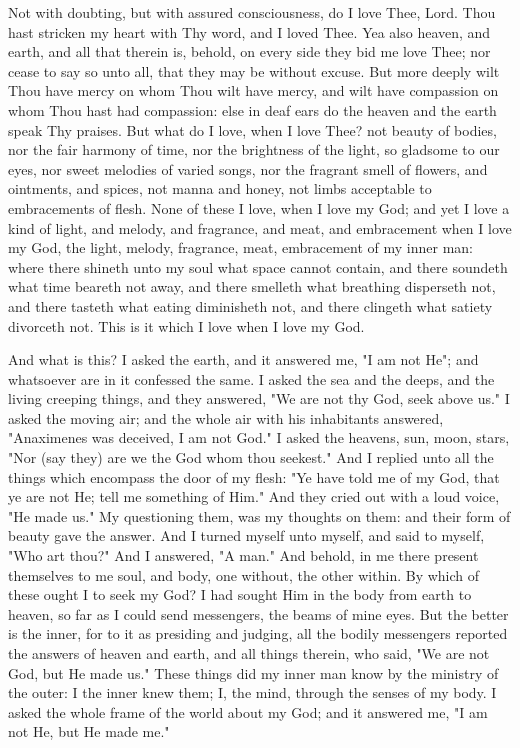 \documentclass[b5paper,openright,12pt,twoside]{book}
\begin{document}
Not with doubting, but with assured consciousness, do I love Thee, Lord.
Thou hast stricken my heart with Thy word, and I loved Thee. Yea also
heaven, and earth, and all that therein is, behold, on every side they
bid me love Thee; nor cease to say so unto all, that they may be without
excuse. But more deeply wilt Thou have mercy on whom Thou wilt have
mercy, and wilt have compassion on whom Thou hast had compassion: else
in deaf ears do the heaven and the earth speak Thy praises. But what do
I love, when I love Thee? not beauty of bodies, nor the fair harmony
of time, nor the brightness of the light, so gladsome to our eyes, nor
sweet melodies of varied songs, nor the fragrant smell of flowers, and
ointments, and spices, not manna and honey, not limbs acceptable to
embracements of flesh. None of these I love, when I love my God; and
yet I love a kind of light, and melody, and fragrance, and meat, and
embracement when I love my God, the light, melody, fragrance, meat,
embracement of my inner man: where there shineth unto my soul what space
cannot contain, and there soundeth what time beareth not away, and there
smelleth what breathing disperseth not, and there tasteth what eating
diminisheth not, and there clingeth what satiety divorceth not. This is
it which I love when I love my God.

And what is this? I asked the earth, and it answered me, "I am not He";
and whatsoever are in it confessed the same. I asked the sea and the
deeps, and the living creeping things, and they answered, "We are not
thy God, seek above us." I asked the moving air; and the whole air with
his inhabitants answered, "Anaximenes was deceived, I am not God." I
asked the heavens, sun, moon, stars, "Nor (say they) are we the God whom
thou seekest." And I replied unto all the things which encompass the
door of my flesh: "Ye have told me of my God, that ye are not He; tell
me something of Him." And they cried out with a loud voice, "He made
us." My questioning them, was my thoughts on them: and their form of
beauty gave the answer. And I turned myself unto myself, and said to
myself, "Who art thou?" And I answered, "A man." And behold, in me there
present themselves to me soul, and body, one without, the other within.
By which of these ought I to seek my God? I had sought Him in the body
from earth to heaven, so far as I could send messengers, the beams
of mine eyes. But the better is the inner, for to it as presiding and
judging, all the bodily messengers reported the answers of heaven and
earth, and all things therein, who said, "We are not God, but He made
us." These things did my inner man know by the ministry of the outer: I
the inner knew them; I, the mind, through the senses of my body. I asked
the whole frame of the world about my God; and it answered me, "I am not
He, but He made me."
\end{document}
